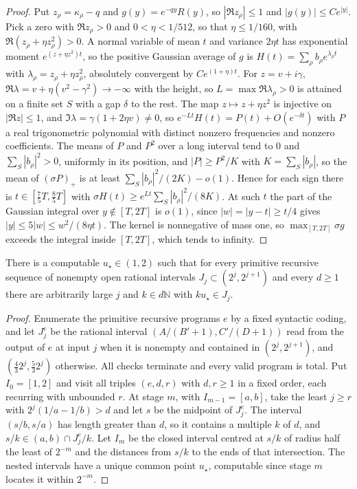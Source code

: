 \begin{proof}
Put $z_\rho=\kappa_\rho-q$ and $g(y)=e^{-qy}R(y)$, so $|\Re z_\rho|\le1$ and $|g(y)|\le Ce^{|y|}$. Pick a zero with $\Re z_\rho>0$ and $0<\eta<1/512$, so that $\eta\le1/160$, with $\Re(z_\rho+\eta z_\rho^2)>0$. A normal variable of mean $t$ and variance $2\eta t$ has exponential moment $e^{(z+\eta z^2)t}$, so the positive Gaussian average of $g$ is $H(t)=\sum_\rho b_\rho e^{\lambda_\rho t}$ with $\lambda_\rho=z_\rho+\eta z_\rho^2$, absolutely convergent by $Ce^{(1+\eta)t}$. For $z=v+i\gamma$, $\Re\lambda=v+\eta(v^2-\gamma^2)\to-\infty$ with the height, so $L=\max\Re\lambda_\rho>0$ is attained on a finite set $S$ with a gap $\delta$ to the rest. The map $z\mapsto z+\eta z^2$ is injective on $|\Re z|\le1$, and $\Im\lambda=\gamma(1+2\eta v)\ne0$, so $e^{-Lt}H(t)=P(t)+O(e^{-\delta t})$ with $P$ a real trigonometric polynomial with distinct nonzero frequencies and nonzero coefficients. The means of $P$ and $P^2$ over a long interval tend to $0$ and $\sum_S|b_\rho|^2>0$, uniformly in its position, and $|P|\ge P^2/K$ with $K=\sum_S|b_\rho|$, so the mean of $(\sigma P)_+$ is at least $\sum_S|b_\rho|^2/(2K)-o(1)$. Hence for each sign there is $t\in[\tfrac75T,\tfrac85T]$ with $\sigma H(t)\ge e^{Lt}\sum_S|b_\rho|^2/(8K)$. At such $t$ the part of the Gaussian integral over $y\notin[T,2T]$ is $o(1)$, since $|w|=|y-t|\ge t/4$ gives $|y|\le5|w|\le w^2/(8\eta t)$. The kernel is nonnegative of mass one, so $\max_{[T,2T]}\sigma g$ exceeds the integral inside $[T,2T]$, which tends to infinity.
\end{proof}
\begin{lemma}\label{st:lem:lattice}
There is a computable $u_\star\in(1,2)$ such that for every primitive recursive sequence of nonempty open rational intervals $J_j\subset(2^j,2^{j+1})$ and every $d\ge1$ there are arbitrarily large $j$ and $k\in d\mathbb N$ with $ku_\star\in J_j$.
\end{lemma}
\begin{proof}
Enumerate the primitive recursive programs $e$ by a fixed syntactic coding, and let $J^e_j$ be the rational interval $(A/(B'+1),C'/(D+1))$ read from the output of $e$ at input $j$ when it is nonempty and contained in $(2^j,2^{j+1})$, and $(\tfrac43 2^j,\tfrac53 2^j)$ otherwise. All checks terminate and every valid program is total. Put $I_0=[1,2]$ and visit all triples $(e,d,r)$ with $d,r\ge1$ in a fixed order, each recurring with unbounded $r$. At stage $m$, with $I_{m-1}=[a,b]$, take the least $j\ge r$ with $2^j(1/a-1/b)>d$ and let $s$ be the midpoint of $J^e_j$. The interval $(s/b,s/a)$ has length greater than $d$, so it contains a multiple $k$ of $d$, and $s/k\in(a,b)\cap J^e_j/k$. Let $I_m$ be the closed interval centred at $s/k$ of radius half the least of $2^{-m}$ and the distances from $s/k$ to the ends of that intersection. The nested intervals have a unique common point $u_\star$, computable since stage $m$ locates it within $2^{-m}$.
\end{proof}
